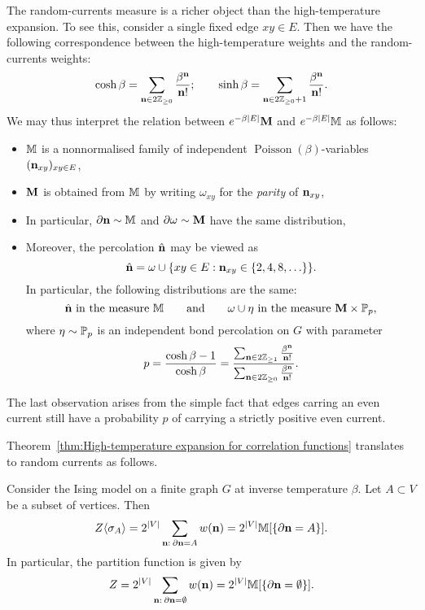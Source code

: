 The random-currents measure is a richer object than the high-temperature expansion.
To see this, consider a single fixed edge $xy\in E$.
Then we have the following correspondence between the high-temperature weights
and the random-currents weights:
\[
    \cosh\beta = \sum_{\n\in 2\Z_{\geq 0}} \frac{\beta^\n}{\n!}
    ;
    \qquad
    \sinh\beta = \sum_{\n\in 2\Z_{\geq 0}+1} \frac{\beta^\n}{\n!}.
\]
We may thus interpret the relation between $e^{-\beta|E|}\bfM$ and $e^{-\beta|E|}\M$ as follows:
\begin{itemize}
    \item $\M$ is a nonnormalised family of independent $\operatorname{Poisson}(\beta)$-variables $(\n_{xy})_{xy\in E}$,
    \item $\bfM$ is obtained from $\M$ by writing $\omega_{xy}$ for the \emph{parity} of $\n_{xy}$,
    \item In particular, $\partial\n\sim\M$ and $\partial\omega\sim\bfM$ have the same distribution,
    \item Moreover, the percolation $\hat\n$ may be viewed as
    \[
        \hat\n = \omega \cup\{xy\in E: \n_{xy}\in\{2,4,8,\ldots\}\}.
    \]
    In particular, the following distributions are the same:
    \begin{equation}
        \label{eq:equivalence}
        \text{$\hat\n$ in the measure $\M$}
        \qquad
        \text{and}
        \qquad
        \text{$\omega\cup\eta$ in the measure $\bfM\times\P_{p}$,}
    \end{equation}
    where $\eta\sim\P_p$ is an independent bond percolation on $G$
    with parameter
    \[
        p
        =\frac{\cosh\beta-1}{\cosh\beta}
        =\frac{
            \sum_{\n\in 2\Z_{\geq 1}} \frac{\beta^\n}{\n!}
        }{
            \sum_{\n\in 2\Z_{\geq 0}} \frac{\beta^\n}{\n!}
        }
        .
    \]
\end{itemize}

The last observation arises from the simple fact that edges carring an even current
still have a probability $p$ of carrying a strictly positive even current.

Theorem~\ref{thm:High-temperature expansion for correlation functions}
translates to random currents as follows.

\begin{theorem}
    \label{thm:current_representation_of_correlation_functions}
    Consider the Ising model on a finite graph $G$ at inverse temperature $\beta$.
    Let $A\subset V$ be a subset of vertices.
    Then
    \[
        Z\langle\sigma_A\rangle
        =2^{|V|}\sum_{\n:\:\partial\n=A}
        w(\n)
        =
        2^{|V|}\M[\{\partial\n=A\}].
    \]
    In particular, the partition function is given by
    \[
        Z=2^{|V|}\sum_{\n:\:\partial\n=\emptyset}
        w(\n)
        =
        2^{|V|}\M[\{\partial\n=\emptyset\}].
    \]
\end{theorem}

